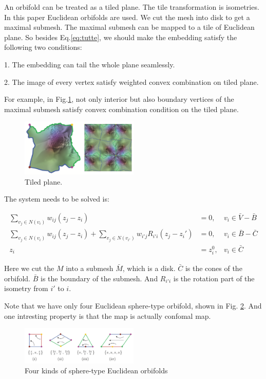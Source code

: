 \documentclass[fleqn,10pt]{wlscirep}
\begin{document}
An orbifold can be treated as a tiled plane. The tile transformation is isometries. In this paper Euclidean orbifolds are used. We cut the mesh into disk to get a maximal submesh. The maximal submesh can be mapped to a tile of Euclidean plane. So besides Eq.\ref{eq:tutte}, we should make the embedding satisfy the following two conditions:

1. The embedding can tail the whole plane seamlessly.

2. The image of every vertex satisfy weighted convex combination on tiled plane.

For example, in Fig.\ref{fig:tile}, not only interior but also boundary vertices of the maximal submesh satisfy convex combination condition on the tiled plane.

\begin{figure}
\centering
\includegraphics[width=0.5\textwidth]{images/euc_orbifold}
\caption{Tiled plane.}
\label{fig:tile}
\end{figure}

The system needs to be solved is:

\begin{equation}
\begin{split}
\sum_{v_j \in N(v_i)}w_{ij}(z_j - z_i) &= 0, &v_i \in \bar{V}-\bar{B}\\
\sum_{v_j \in N(v_i)}w_{ij}(z_j - z_i) + \sum_{v_j\in N(v_{i'})} w_{i'j}R_{i'i}(z_j - z_i')&= 0, &v_i \in \bar{B} - \bar{C}\\
z_i &= z_i^0 , &v_i \in \bar{C}
\end{split}
\end{equation}

Here we cut the $M$ into a submesh $\bar{M}$, which is a disk. $\bar{C}$ is the cones of the orbifold. $\bar{B}$ is
the boundary of the submesh. And $R_{i'i}$ is the rotation part of the isometry from $i'$ to $i$.

Note that we have only four Euclidean sphere-type orbifold, shown in Fig. \ref{fig:four-kinds}. And one intresting property is that the map is actually confomal map.

\begin{figure}
\centering
\includegraphics[width=0.5\textwidth]{images/four_euc_orbifolds}
\caption{Four kinds of sphere-type Euclidean orbifolds}
\label{fig:four-kinds}
\end{figure}
\end{document}
